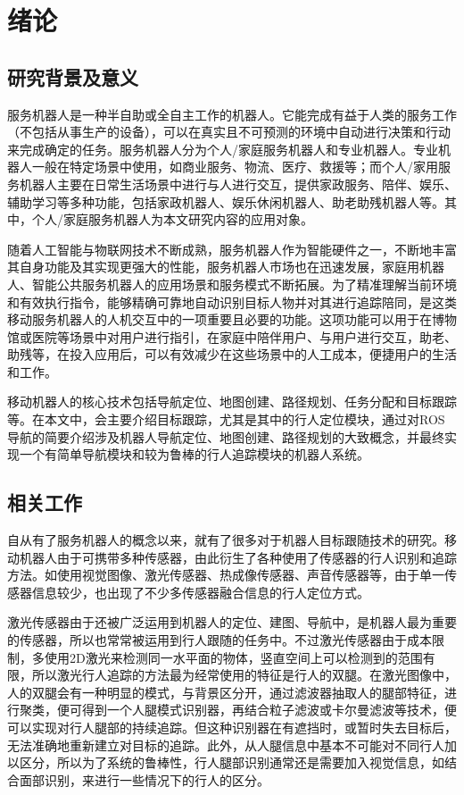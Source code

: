 
\chapter{绪论}

\section{研究背景及意义}

  服务机器人是一种半自助或全自主工作的机器人。它能完成有益于人类的服务工作（不包括从事生产的设备），可以在真实且不可预测的环境中自动进行决策和行动来完成确定的任务。服务机器人分为个人/家庭服务机器人和专业机器人。专业机器人一般在特定场景中使用，如商业服务、物流、医疗、救援等；而个人/家用服务机器人主要在日常生活场景中进行与人进行交互，提供家政服务、陪伴、娱乐、辅助学习等多种功能，包括家政机器人、娱乐休闲机器人、助老助残机器人等。其中，个人/家庭服务机器人为本文研究内容的应用对象。

  随着人工智能与物联网技术不断成熟，服务机器人作为智能硬件之一，不断地丰富其自身功能及其实现更强大的性能，服务机器人市场也在迅速发展，家庭用机器人、智能公共服务机器人的应用场景和服务模式不断拓展。为了精准理解当前环境和有效执行指令，能够精确可靠地自动识别目标人物并对其进行追踪陪同，是这类移动服务机器人的人机交互中的一项重要且必要的功能。这项功能可以用于在博物馆或医院等场景中对用户进行指引，在家庭中陪伴用户、与用户进行交互，助老、助残等，在投入应用后，可以有效减少在这些场景中的人工成本，便捷用户的生活和工作。

  移动机器人的核心技术包括导航定位、地图创建、路径规划、任务分配和目标跟踪等。在本文中，会主要介绍目标跟踪，尤其是其中的行人定位模块，通过对ROS导航的简要介绍涉及机器人导航定位、地图创建、路径规划的大致概念，并最终实现一个有简单导航模块和较为鲁棒的行人追踪模块的机器人系统。

\section{相关工作}

  自从有了服务机器人的概念以来，就有了很多对于机器人目标跟随技术的研究。移动机器人由于可携带多种传感器，由此衍生了各种使用了传感器的行人识别和追踪方法。如使用视觉图像、激光传感器、热成像传感器\cite{treptow2006real}、声音传感器\cite{zhou2008target}等，由于单一传感器信息较少，也出现了不少多传感器融合信息的行人定位方式\cite{susperregi2013rgb}。

  激光传感器由于还被广泛运用到机器人的定位、建图、导航中，是机器人最为重要的传感器，所以也常常被运用到行人跟随的任务中。不过激光传感器由于成本限制，多使用2D激光来检测同一水平面的物体，竖直空间上可以检测到的范围有限，所以激光行人追踪的方法最为经常使用的特征是行人的双腿\cite{arras2008efficient}。在激光图像中，人的双腿会有一种明显的模式，与背景区分开，通过滤波器抽取人的腿部特征，进行聚类，便可得到一个人腿模式识别器，再结合粒子滤波或卡尔曼滤波等技术，便可以实现对行人腿部的持续追踪。但这种识别器在有遮挡时，或暂时失去目标后，无法准确地重新建立对目标的追踪。此外，从人腿信息中基本不可能对不同行人加以区分，所以为了系统的鲁棒性，行人腿部识别通常还是需要加入视觉信息，如结合面部识别，来进行一些情况下的行人的区分\cite{kleinehagenbrock2002person,bellotto2008multisensor}。

